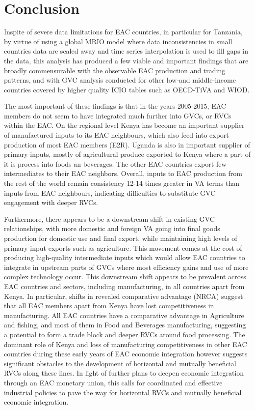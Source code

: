 \documentclass[a4paper]{article}
\begin{document}
\section{Conclusion} 

Inspite of severe data limitations for EAC countries, in particular for Tanzania, by virtue of using a global MRIO model where data inconsistencies in small countries data are scaled away and time series interpolation is used to fill gaps in the data, this analysis has produced a few viable and important findings that are broadly commensurable with the observable EAC production and trading patterns, and  with GVC analysis conducted for other low-and middle-income countries covered by higher quality ICIO tables such as OECD-TiVA and WIOD. \newline

The most important of these findings is that in the years 2005-2015, EAC members do not seem to have integrated much further into GVCs, or RVCs within the EAC. On the regional level Kenya has become an important supplier of manufactured inputs to its EAC neighbours, which also feed into export production of most EAC members (E2R). Uganda is also in important supplier of primary inputs, mostly of agricultural produce exported to Kenya where a part of it is process into foods an beverages. The other EAC countries export few intermediates to their EAC neighbors. Overall, inputs to EAC production from the rest of the world remain consistency 12-14 times greater in VA terms than inputs from EAC neighbours, indicating difficulties to substitute GVC engagement with deeper RVCs.  \newline

Furthermore, there appears to be a downstream shift in existing GVC relationships, with more domestic and foreign VA going into final goods production for domestic use and final export, while maintaining high levels of primary input exports such as agriculture. This movement comes at the cost of producing high-quality intermediate inputs which would allow EAC countries to integrate in upstream parts of GVCs where most efficiency gains and use of more complex technology occur. This downstream shift appears to be prevalent across EAC countries and sectors, including manufacturing, in all countries apart from Kenya. In particular, shifts in revealed comparative advantage (NRCA) suggest that all EAC members apart from Kenya have lost competitiveness in manufacturing. All EAC countries have a comparative advantage in Agriculture and fishing, and most of them in Food and Beverages manufacturing, suggesting a potential to form a trade block and deeper RVCs around food processing. The dominant role of Kenya and loss of manufacturing competitiveness in other EAC countries during these early years of EAC economic integration however suggests significant obstacles to the development of horizontal and mutually beneficial RVCs along these lines. In light of further plans to deepen economic integration through an EAC monetary union, this calls for coordinated and effective industrial policies to pave the way for horizontal RVCs and mutually beneficial economic integration. \newline 
\end{document}
